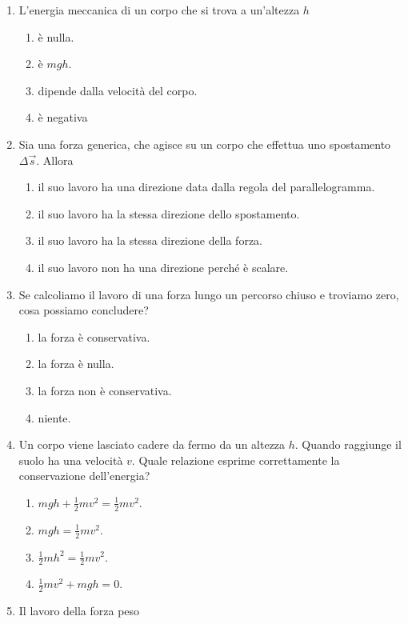 \documentclass{article}
\begin{document}
\begin{enumerate}
\begin{enumerate}[label=\Alph*.]
  \end{enumerate}
  \item L'energia meccanica di un corpo che si trova a un'altezza $h$
  \begin{enumerate}[label=\Alph*.]
    \item è nulla.
    \item è $mgh$.
    \item dipende dalla velocità del corpo.
    \item è negativa
  \end{enumerate}
  \item Sia  una forza generica, che agisce su un corpo che effettua uno spostamento $\Delta \vec{s}$. Allora
  \begin{enumerate}[label=\Alph*.]
    \item il suo lavoro ha una direzione data dalla regola del parallelogramma.
    \item il suo lavoro ha la stessa direzione dello spostamento.
    \item il suo lavoro ha la stessa direzione della forza.
    \item il suo lavoro non ha una direzione perché è scalare.
  \end{enumerate}
  \item Se calcoliamo il lavoro di una forza lungo un percorso chiuso e troviamo zero, cosa possiamo concludere?
  \begin{enumerate}[label=\Alph*.]
    \item la forza è conservativa.
    \item la forza è nulla.
    \item la forza non è conservativa.
    \item niente.
  \end{enumerate}
  \item Un corpo viene lasciato cadere da fermo da un altezza $h$. Quando raggiunge il suolo ha una velocità $v$. Quale relazione esprime correttamente la conservazione dell'energia?
  \begin{enumerate}[label=\Alph*.]
    \item $mgh+\frac{1}{2}mv^2=\frac{1}{2}mv^2.$
    \item $mgh=\frac{1}{2}mv^2$.
    \item $\frac{1}{2}mh^2=\frac{1}{2}mv^2$.
    \item $\frac{1}{2}mv^2+mgh=0.$
  \end{enumerate}
  \item Il lavoro della forza peso

\end{enumerate}
\end{document}
